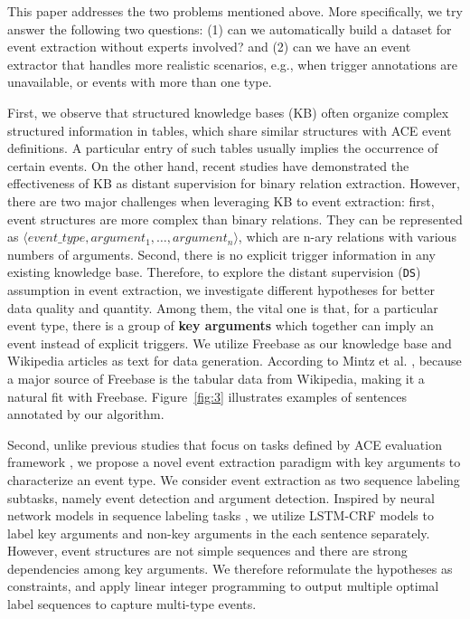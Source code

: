This paper addresses the two problems mentioned above. More specifically, we try answer the following two questions:
(1) can we automatically build a dataset for event extraction without experts involved?
and (2) can we have an event extractor that handles more realistic scenarios, e.g.,  when trigger annotations are unavailable, or events with more than one type.



First, we observe that structured knowledge bases (KB) often organize complex structured information in tables, which
share similar structures with ACE event definitions. A particular entry of such tables usually implies the occurrence
of certain events. On the other hand, recent studies \cite{mintz2009distant,zeng2015distant} have demonstrated the
effectiveness of KB as distant supervision for binary relation extraction. However, there are two major challenges when
leveraging KB to event extraction: first, event structures are more complex than binary relations. They can be
represented as $\langle event\_type, argument_1, \ldots, argument_n\rangle$, which are n-ary relations with various
numbers of arguments. Second, there is no explicit trigger information in any existing knowledge base. Therefore, to
explore the distant supervision (\texttt{DS}) assumption in event extraction, we investigate different hypotheses for
better data quality and quantity. Among them, the vital one is that, for a particular event type, there is a group of
\textbf{key arguments} which together can imply an event instead of explicit triggers. We utilize Freebase as our
knowledge base and Wikipedia articles as text for data generation. According to Mintz et al.
, because a major source of Freebase is the tabular data from Wikipedia, making it a
natural fit with Freebase. Figure~\ref{fig:3} illustrates examples of sentences annotated by our algorithm.

Second, unlike previous studies that focus on tasks defined by ACE evaluation framework
\cite{ahn2006stages,li2013joint,chen2015event,nguyen2016joint}, we propose a novel event extraction paradigm with key
arguments to characterize an event type. We consider event extraction as two sequence labeling subtasks, namely event
detection and argument detection. Inspired by neural network models in sequence labeling tasks
\cite{huang2015bidirectional,lample2016neural}, we utilize LSTM-CRF models to label key arguments and non-key arguments
in the each sentence separately. However, event structures are not simple sequences and there are strong dependencies
among key arguments. We therefore reformulate the hypotheses as constraints, and apply linear integer programming to
output multiple optimal label sequences to capture multi-type events.

